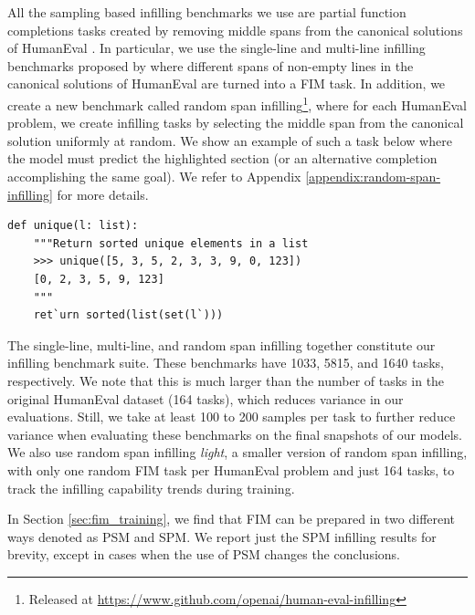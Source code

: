 \documentclass[postscript]{article}
\begin{document}
All the sampling based infilling benchmarks we use are partial function completions tasks created by  removing middle spans from the canonical solutions of  HumanEval \citep{codex}. In particular, we use the single-line and multi-line infilling benchmarks proposed by \citep{incoder} where different spans of non-empty lines in the canonical solutions of HumanEval are turned into a FIM task. In addition, we create a new benchmark called random span infilling\footnote{Released at \url{https://www.github.com/openai/human-eval-infilling}}, where for each HumanEval problem, we create infilling tasks by selecting the middle span from the canonical solution uniformly at random. We show an example of such a task below where the model must predict the highlighted section (or an alternative completion accomplishing the same goal). We refer to Appendix \ref{appendix:random-span-infilling} for more details.



\vspace{-6pt}
\begin{center}
\begin{minipage}{5in}
\begin{lstlisting}[style=python]
def unique(l: list):
    """Return sorted unique elements in a list
    >>> unique([5, 3, 5, 2, 3, 3, 9, 0, 123])
    [0, 2, 3, 5, 9, 123]
    """
    ret`urn sorted(list(set(l`)))
\end{lstlisting}
\end{minipage}
\end{center}
\vspace{-6pt}

The single-line, multi-line, and random span infilling  together constitute our infilling benchmark suite. These benchmarks have  1033, 5815, and 1640 tasks, respectively. We note that this is much larger than the number of tasks in the original HumanEval dataset (164 tasks), which reduces variance in our evaluations. Still, we take at least 100 to 200 samples per task to further reduce variance when evaluating these benchmarks on the final snapshots of our models. We also use random span infilling \emph{light}, a smaller version of random span infilling, with only one random FIM task per HumanEval problem and just 164 tasks, to  track the infilling capability trends during training.

In Section \ref{sec:fim_training}, we find that FIM can be prepared in two different ways denoted as PSM and SPM. We report just the SPM infilling results for brevity, except in cases when the use of PSM changes the conclusions.
\end{document}
